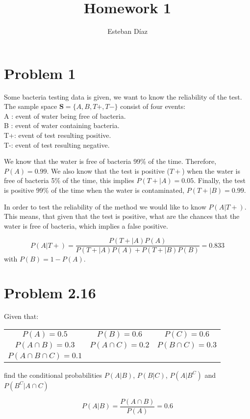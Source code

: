 \documentclass[10pt]{article}
\author{Esteban D\'{i}az}
\title{Homework 1}{}
\begin{document}
\maketitle

\section{Problem 1}

Some bacteria testing data is given, we want to know the reliability 
of the test. The sample space $\mathbf{S}=\{A,B,T+,T-\}$ consist of four events:\\
A : event of water being free of bacteria. \\
B : event of water containing bacteria. \\
T+: event of test resulting positive. \\
T-: event of test resulting negative.

We know that the water is free of bacteria 99\% of the time. Therefore, $P(A)=0.99$. 
 We also know that the test is positive ($T+$) when the water is free of bacteria 5\% of the 
time, this implies $P(T+|A)=0.05$. Finally, the test is positive 99\% of the time when the water
is contaminated, $P(T+|B)=0.99$. 

In order to test the reliability of the method we would like to know $P(A|T+)$. This means, that
given that the test is positive, what are the chances that the water is free of bacteria, which
implies a false positive.

\[
P(A|T+) =\frac{P(T+|A)P(A)}{P(T+|A)P(A)+P(T+|B)P(B)} = 0.833
\]
with $P(B)=1-P(A)$.


\section{Problem 2.16}
Given that:

\begin{tabular}{ c c c }
  $P(A)=0.5$       & $P(B)=0.6$        & $P(C)=0.6$ \\
  $P(A\cap B)=0.3$ & $P(A\cap C)=0.2$  & $P(B\cap C)=0.3$ \\
  $P(A\cap B \cap C)=0.1$ &  &  \\
\end{tabular}

find the conditional probabilities $P(A|B)$, $P(B|C)$, $P(A|B^C)$ and \\ $P(B^C|A\cap C)$

\[
P(A|B)=\frac{P(A\cap B)}{P(A)} = 0.6 
\]
\end{document}

